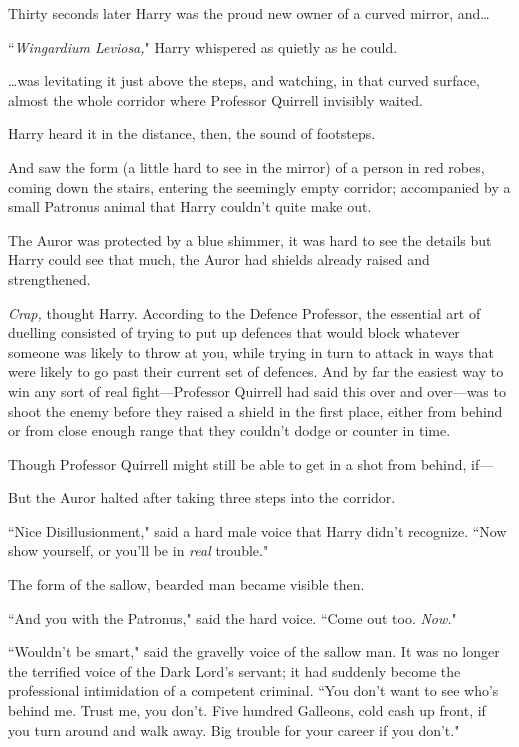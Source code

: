 Thirty seconds later Harry was the proud new owner of a curved mirror, and…

``\emph{Wingardium Leviosa,}" Harry whispered as quietly as he could.

…was levitating it just above the steps, and watching, in that curved surface, almost the whole corridor where Professor Quirrell invisibly waited.

Harry heard it in the distance, then, the sound of footsteps.

And saw the form (a little hard to see in the mirror) of a person in red robes, coming down the stairs, entering the seemingly empty corridor; accompanied by a small Patronus animal that Harry couldn't quite make out.

The Auror was protected by a blue shimmer, it was hard to see the details but Harry could see that much, the Auror had shields already raised and strengthened.

\emph{Crap,} thought Harry. According to the Defence Professor, the essential art of duelling consisted of trying to put up defences that would block whatever someone was likely to throw at you, while trying in turn to attack in ways that were likely to go past their current set of defences. And by far the easiest way to win any sort of real fight—Professor Quirrell had said this over and over—was to shoot the enemy before they raised a shield in the first place, either from behind or from close enough range that they couldn't dodge or counter in time.

Though Professor Quirrell might still be able to get in a shot from behind, if—

But the Auror halted after taking three steps into the corridor.

``Nice Disillusionment," said a hard male voice that Harry didn't recognize. ``Now show yourself, or you'll be in \emph{real} trouble."

The form of the sallow, bearded man became visible then.

``And you with the Patronus," said the hard voice. ``Come out too. \emph{Now.}"

``Wouldn't be smart," said the gravelly voice of the sallow man. It was no longer the terrified voice of the Dark Lord's servant; it had suddenly become the professional intimidation of a competent criminal. ``You don't want to see who's behind me. Trust me, you don't. Five hundred Galleons, cold cash up front, if you turn around and walk away. Big trouble for your career if you don't."

